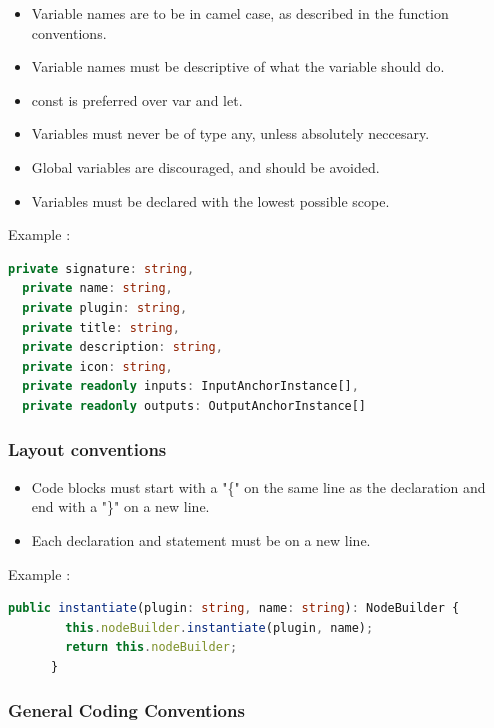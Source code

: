 \documentclass[11pt,a4paper]{article}
\begin{document}
\begin{itemize}
    \item[\textbullet] Variable names are to be in camel case, as described in the function conventions.
    \item[\textbullet] Variable names must be descriptive of what the variable should do.
    \item[\textbullet] const is preferred over var and let.
    \item[\textbullet] Variables must never be of type any, unless absolutely neccesary.
    \item[\textbullet] Global variables are discouraged, and should be avoided.
    \item[\textbullet] Variables must be declared with the lowest possible scope. 
\end{itemize}

Example :

\begin{lstlisting}[language=TypeScript]
  private signature: string,
  private name: string,
  private plugin: string,
  private title: string,
  private description: string,
  private icon: string,
  private readonly inputs: InputAnchorInstance[],
  private readonly outputs: OutputAnchorInstance[]
\end{lstlisting}

\subsubsection*{Layout conventions}

\begin{itemize}
    \item[\textbullet] Code blocks must start with a "\{" on the same line as the declaration and end with a "\}" on a new line.
    \item[\textbullet] Each declaration and statement must be on a new line.
\end{itemize}

Example :

\begin{lstlisting}[language=TypeScript]
    public instantiate(plugin: string, name: string): NodeBuilder {
        this.nodeBuilder.instantiate(plugin, name);
        return this.nodeBuilder;
      }
\end{lstlisting}


\subsubsection*{General Coding Conventions}
\end{document}

